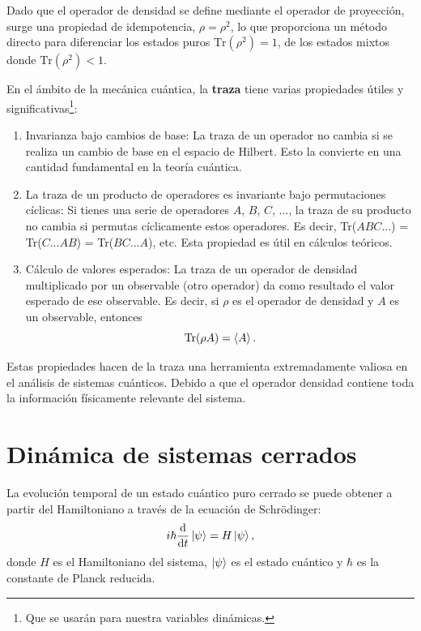 \documentclass[main.tex]{subfiles}
\begin{document}
Dado que el operador de densidad se define mediante el operador de proyección, surge una propiedad de idempotencia, $\rho= \rho^2$, lo que proporciona un método directo para diferenciar los estados puros $\text{Tr}(\rho^2) =1$, de los estados mixtos donde $\text{Tr}(\rho^2) < 1$.

En el ámbito de la mecánica cuántica, la \textbf{traza} tiene varias propiedades útiles y significativas\footnote{Que se usarán para nuestra variables dinámicas.}:
\begin{enumerate}[1.]
	\item Invarianza bajo cambios de base: La traza de un operador no cambia si se realiza un cambio de base en el espacio de Hilbert. Esto la convierte en una cantidad fundamental en la teoría cuántica.
	\item La traza de un producto de operadores es invariante bajo permutaciones cíclicas: Si tienes una serie de operadores $A$, $B$, $C$, ..., la traza de su producto no cambia si permutas cíclicamente estos operadores. Es decir, Tr($ABC...$) = Tr($C...AB$) = Tr($BC...A$), etc. Esta propiedad es útil en cálculos teóricos.
	\item Cálculo de valores esperados: La traza de un operador de densidad multiplicado por un observable (otro operador) da como resultado el valor esperado de ese observable. Es decir, si $\rho$ es el operador de densidad y $A$ es un observable, entonces 
	\begin{equation}
		\text{Tr}(\rho A) = \braket{A}.
	\end{equation}
\end{enumerate}

Estas propiedades hacen de la traza una herramienta extremadamente valiosa en el análisis de sistemas cuánticos. Debido a que el operador densidad contiene toda la información físicamente relevante del sistema.

\section{Dinámica de sistemas cerrados}

La evolución temporal de un estado cuántico puro cerrado se puede obtener a partir del Hamiltoniano a través de la ecuación de Schrödinger:
\begin{equation} \label{eq:schrodinger}
	i \hbar \frac{\mathrm{d}}{\mathrm{d}t} \ket{\psi} = H \ket{\psi},
\end{equation}
donde $H$ es el Hamiltoniano del sistema, $\ket{\psi}$ es el estado cuántico y $\hbar$ es la constante de Planck reducida.
\end{document}
